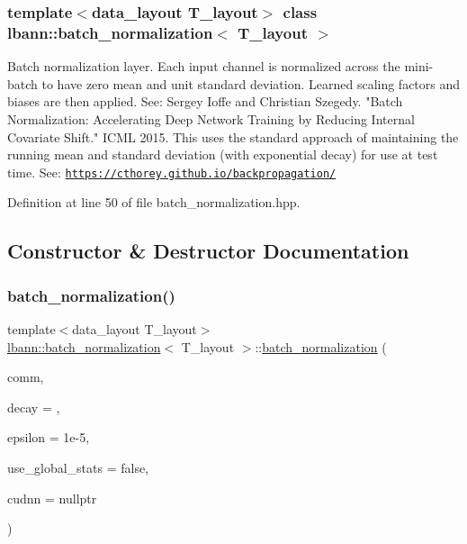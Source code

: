 \subsubsection*{template$<$data\+\_\+layout T\+\_\+layout$>$\newline
class lbann\+::batch\+\_\+normalization$<$ T\+\_\+layout $>$}

Batch normalization layer. Each input channel is normalized across the mini-\/batch to have zero mean and unit standard deviation. Learned scaling factors and biases are then applied. See\+: Sergey Ioffe and Christian Szegedy. "Batch Normalization\+: Accelerating Deep Network Training by Reducing Internal Covariate Shift." I\+C\+ML 2015. This uses the standard approach of maintaining the running mean and standard deviation (with exponential decay) for use at test time. See\+: \href{https://cthorey.github.io/backpropagation/}{\tt https\+://cthorey.\+github.\+io/backpropagation/} 

Definition at line 50 of file batch\+\_\+normalization.\+hpp.



\subsection{Constructor \& Destructor Documentation}
\mbox{\label{classlbann_1_1batch__normalization_a04f092712566fd732e5fc5e48ee16f4d}} 
\subsubsection{\texorpdfstring{batch\+\_\+normalization()}{batch\_normalization()}\hspace{0.1cm}{\footnotesize\ttfamily [1/2]}}
{\footnotesize\ttfamily template$<$data\+\_\+layout T\+\_\+layout$>$ \\
\hyperlink{classlbann_1_1batch__normalization}{lbann\+::batch\+\_\+normalization}$<$ T\+\_\+layout $>$\+::\hyperlink{classlbann_1_1batch__normalization}{batch\+\_\+normalization} (\begin{DoxyParamCaption}\item[{\hyperlink{classlbann_1_1lbann__comm}{lbann\+\_\+comm} $\ast$}]{comm,  }\item[{Data\+Type}]{decay = {},  }\item[{Data\+Type}]{epsilon = {\ttfamily 1e-\/5},  }\item[{bool}]{use\+\_\+global\+\_\+stats = {\ttfamily false},  }\item[{\hyperlink{classlbann_1_1cudnn_1_1cudnn__manager}{cudnn\+::cudnn\+\_\+manager} $\ast$}]{cudnn = {\ttfamily nullptr} }\end{DoxyParamCaption})\hspace{0.3cm}{\ttfamily [inline]}}


